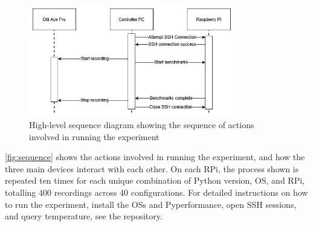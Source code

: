 \begin{figure}[H]
    \centering
    \includegraphics[width=0.8\textwidth]{images/thesis_sequence.png}
    \caption{High-level sequence diagram showing the sequence of actions involved in running the experiment}
    \label{fig:sequence}
\end{figure}

\autoref{fig:sequence} shows the actions involved in running the experiment, and how the three main devices interact with each other. On each RPi, the process shown is repeated ten times for each unique combination of Python version, OS, and RPi, totalling 400 recordings across 40 configurations. For detailed instructions on how to run the experiment, install the OSs and Pyperformance, open SSH sessions, and query temperature, see the repository.
